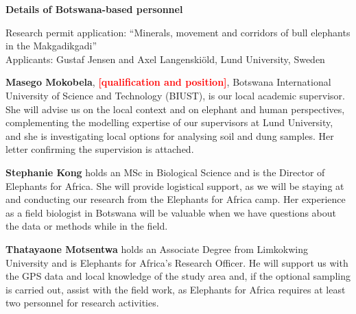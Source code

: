 \documentclass[12pt,a4paper]{article}
\newcommand{\todo}[1]{\textcolor{red}{\textbf{[#1]}}}
\begin{document}
{\Large\textbf{Details of Botswana-based personnel}\par}
\vspace{0.3cm}
Research permit application: ``Minerals, movement and corridors of bull elephants in the Makgadikgadi''\\
Applicants: Gustaf Jensen and Axel Langenskiöld, Lund University, Sweden

\vspace{0.4cm}
\textbf{Masego Mokobela}, \todo{qualification and position}, Botswana International University of Science and Technology (BIUST), is our local academic supervisor. She will advise us on the local context and on elephant and human perspectives, complementing the modelling expertise of our supervisors at Lund University, and she is investigating local options for analysing soil and dung samples. Her letter confirming the supervision is attached.

\textbf{Stephanie Kong} holds an MSc in Biological Science and is the Director of Elephants for Africa. She will provide logistical support, as we will be staying at and conducting our research from the Elephants for Africa camp. Her experience as a field biologist in Botswana will be valuable when we have questions about the data or methods while in the field.

\textbf{Thatayaone Motsentwa} holds an Associate Degree from Limkokwing University and is Elephants for Africa's Research Officer. He will support us with the GPS data and local knowledge of the study area and, if the optional sampling is carried out, assist with the field work, as Elephants for Africa requires at least two personnel for research activities.
\end{document}
